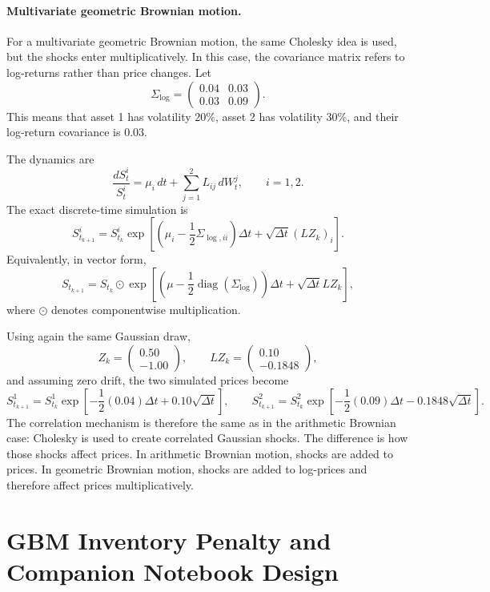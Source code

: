 \documentclass[a4paper,10pt,titlepage,oneside,openany]{book}
\theoremstyle{plain}\newtheorem{theorem}{Theorem}[chapter]
\theoremstyle{definition}\newtheorem{definition}{Definition}[chapter]
\theoremstyle{remark}\newtheorem{remark}{Remark}[chapter]
\begin{document}
\paragraph{Multivariate geometric Brownian motion.}
For a multivariate geometric Brownian motion, the same Cholesky idea is used, but the shocks enter multiplicatively. In this case, the covariance matrix refers to log-returns rather than price changes. Let
\[
\Sigma_{\log}
=
\begin{pmatrix}
0.04 & 0.03\\
0.03 & 0.09
\end{pmatrix}.
\]
This means that asset 1 has volatility $20\%$, asset 2 has volatility $30\%$, and their log-return covariance is $0.03$.

The dynamics are
\[
\frac{dS_t^i}{S_t^i}
=
\mu_i\,dt+\sum_{j=1}^{2}L_{ij}\,dW_t^j,
\qquad i=1,2.
\]
The exact discrete-time simulation is
\[
S_{t_{k+1}}^i
=
S_{t_k}^i
\exp\!\left[
\left(\mu_i-\frac{1}{2}\Sigma_{\log,ii}\right)\Delta t
+
\sqrt{\Delta t}(LZ_k)_i
\right].
\]
Equivalently, in vector form,
\[
S_{t_{k+1}}
=
S_{t_k}
\odot
\exp\!\left[
\left(\mu-\frac{1}{2}\operatorname{diag}(\Sigma_{\log})\right)\Delta t
+
\sqrt{\Delta t}LZ_k
\right],
\]
where $\odot$ denotes componentwise multiplication.

Using again the same Gaussian draw,
\[
Z_k=
\begin{pmatrix}
0.50\\
-1.00
\end{pmatrix},
\qquad
LZ_k=
\begin{pmatrix}
0.10\\
-0.1848
\end{pmatrix},
\]
and assuming zero drift, the two simulated prices become
\[
S_{t_{k+1}}^1
=
S_{t_k}^1
\exp\!\left[
-\frac{1}{2}(0.04)\Delta t
+
0.10\sqrt{\Delta t}
\right],
\qquad
S_{t_{k+1}}^2
=
S_{t_k}^2
\exp\!\left[
-\frac{1}{2}(0.09)\Delta t
-
0.1848\sqrt{\Delta t}
\right].
\]
The correlation mechanism is therefore the same as in the arithmetic Brownian case: Cholesky is used to create correlated Gaussian shocks. The difference is how those shocks affect prices. In arithmetic Brownian motion, shocks are added to prices. In geometric Brownian motion, shocks are added to log-prices and therefore affect prices multiplicatively.

\section{GBM Inventory Penalty and Companion Notebook Design}
\end{document}
